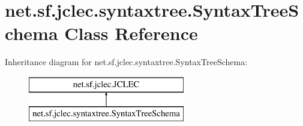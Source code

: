 \hypertarget{classnet_1_1sf_1_1jclec_1_1syntaxtree_1_1_syntax_tree_schema}{\section{net.\-sf.\-jclec.\-syntaxtree.\-Syntax\-Tree\-Schema Class Reference}
\label{classnet_1_1sf_1_1jclec_1_1syntaxtree_1_1_syntax_tree_schema}
}
Inheritance diagram for net.\-sf.\-jclec.\-syntaxtree.\-Syntax\-Tree\-Schema\-:\begin{figure}[H]
\begin{center}
\leavevmode
\includegraphics[height=2.000000cm]{classnet_1_1sf_1_1jclec_1_1syntaxtree_1_1_syntax_tree_schema}
\end{center}
\end{figure}
